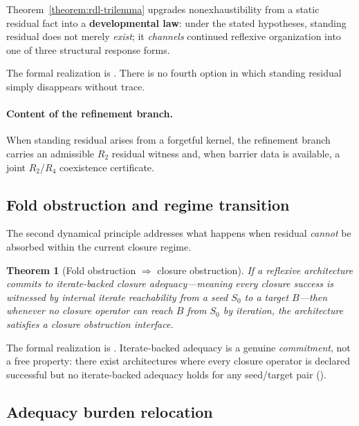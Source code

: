 \documentclass[11pt]{article}
\theoremstyle{plain}
\newtheorem{theorem}{Theorem}[section]
\theoremstyle{definition}
\theoremstyle{remark}
\begin{document}
Theorem~\ref{theorem:rdl-trilemma} upgrades nonexhaustibility from a static residual fact into a \textbf{developmental law}: under the stated hypotheses, standing residual does not merely \emph{exist}; it \emph{channels} continued reflexive organization into one of three structural response forms.

\noindent The formal realization is . There is no fourth option in which standing residual simply disappears without trace.

\paragraph{Content of the refinement branch.}
When standing residual arises from a forgetful kernel, the refinement branch carries an admissible \(R_2\) residual witness and, when barrier data is available, a joint \(R_2\)/\(R_4\) coexistence certificate.

\subsection{Fold obstruction and regime transition}

The second dynamical principle addresses what happens when residual \emph{cannot} be absorbed within the current closure regime.

\begin{theorem}[Fold obstruction \(\Rightarrow\) closure obstruction]\label{theorem:fold-obstruction}
If a reflexive architecture commits to iterate-backed closure adequacy---meaning every closure success is witnessed by internal iterate reachability from a seed \(S_0\) to a target \(B\)---then whenever \emph{no} closure operator can reach \(B\) from \(S_0\) by iteration, the architecture satisfies a closure obstruction interface.
\end{theorem}

\noindent The formal realization is .\linebreak
Iterate-backed adequacy is a genuine \emph{commitment}, not a free property: there exist architectures where every closure operator is declared successful but no iterate-backed adequacy holds for any seed/target pair ().

\subsection{Adequacy burden relocation}
\end{document}

